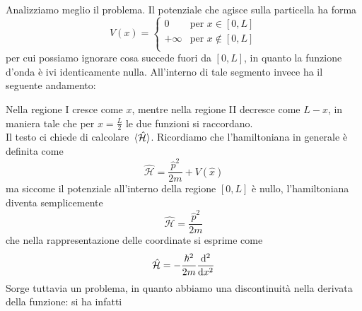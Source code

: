 \begin{soluzione}
   Analizziamo meglio il problema. Il potenziale che agisce sulla particella ha forma
   \begin{equation*}
      V(x)=
      \begin{cases}
         0 & \text{per } x \in [0,L]\\
         +\infty & \text{per } x \notin [0,L]\\
      \end{cases}
   \end{equation*}
   per cui possiamo ignorare cosa succede fuori da $[0,L]$, in quanto la funzione d'onda è ivi identicamente nulla. All'interno di tale segmento invece ha il seguente andamento:
   \begin{figure}[H]
      \centering
   \end{figure}
   Nella regione I cresce come $x$, mentre nella regione II decresce come $L - x$, in maniera tale che per $x=\frac{L}{2}$ le due funzioni si raccordano.\\
   Il testo ci chiede di calcolare $\expval*{\hat{\mathcal{H}}}$. Ricordiamo che l'hamiltoniana in generale è definita come
   \begin{equation*}
      \hat{\mathcal{H}}=\frac{\hat{p}^2}{2m} + V(\hat{x})
   \end{equation*}
   ma siccome il potenziale all'interno della regione $[0,L]$ è nullo, l'hamiltoniana diventa semplicemente
   \begin{equation*}
      \hat{\mathcal{H}}=\frac{\hat{p}^2}{2m}
   \end{equation*}
   che nella rappresentazione delle coordinate si esprime come
   \begin{equation*}
      \hat{\mathcal{H}}=-\frac{\hbar^2}{2m} \dv[2]{x}
   \end{equation*}
   Sorge tuttavia un problema, in quanto abbiamo una discontinuità nella derivata della funzione: si ha infatti\\
   \begin{minipage}{0.5\textwidth}
      \vspace{0.5cm}

\end{minipage}
\end{soluzione}
